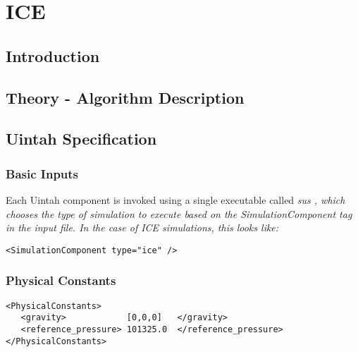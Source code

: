 
\section{ICE} \label{Sec:ICE}


\subsection{Introduction}

\subsection{Theory - Algorithm Description}

\subsection{Uintah Specification}
\subsubsection{Basic Inputs}

Each Uintah component is invoked using a single executable called
\it sus \normalfont, which chooses the type of simulation
to execute based on the \it SimulationComponent \normalfont tag in the
input file.  In the case of ICE simulations, this looks like:

\begin{Verbatim}[fontsize=\footnotesize]
 <SimulationComponent type="ice" />
\end{Verbatim}

\subsubsection{Physical Constants}

\begin{Verbatim}[fontsize=\footnotesize]
<PhysicalConstants>
   <gravity>            [0,0,0]   </gravity>
   <reference_pressure> 101325.0  </reference_pressure>
</PhysicalConstants>
\end{Verbatim}

